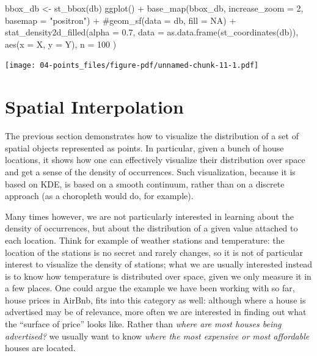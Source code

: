\documentclass[
  letterpaper,
  DIV=11,
  numbers=noendperiod,
  oneside]{scrreprt}
\newenvironment{Shaded}{\begin{snugshade}}{\end{snugshade}}
\newcommand{\AttributeTok}[1]{\textcolor[rgb]{0.40,0.45,0.13}{#1}}
\newcommand{\CommentTok}[1]{\textcolor[rgb]{0.37,0.37,0.37}{#1}}
\newcommand{\DecValTok}[1]{\textcolor[rgb]{0.68,0.00,0.00}{#1}}
\newcommand{\FloatTok}[1]{\textcolor[rgb]{0.68,0.00,0.00}{#1}}
\newcommand{\FunctionTok}[1]{\textcolor[rgb]{0.28,0.35,0.67}{#1}}
\newcommand{\NormalTok}[1]{\textcolor[rgb]{0.00,0.23,0.31}{#1}}
\newcommand{\OtherTok}[1]{\textcolor[rgb]{0.00,0.23,0.31}{#1}}
\newcommand{\SpecialCharTok}[1]{\textcolor[rgb]{0.37,0.37,0.37}{#1}}
\newcommand{\StringTok}[1]{\textcolor[rgb]{0.13,0.47,0.30}{#1}}
\begin{document}
\begin{Shaded}
\begin{Highlighting}[]
\NormalTok{bbox\_db }\OtherTok{\textless{}{-}} \FunctionTok{st\_bbox}\NormalTok{(db)}
\FunctionTok{ggplot}\NormalTok{() }\SpecialCharTok{+}
  \FunctionTok{base\_map}\NormalTok{(bbox\_db, }\AttributeTok{increase\_zoom =} \DecValTok{2}\NormalTok{, }\AttributeTok{basemap =} \StringTok{"positron"}\NormalTok{) }\SpecialCharTok{+}
  \CommentTok{\#geom\_sf(data = db, fill = NA) +}
  \FunctionTok{stat\_density2d\_filled}\NormalTok{(}\AttributeTok{alpha =} \FloatTok{0.7}\NormalTok{,}
    \AttributeTok{data =} \FunctionTok{as.data.frame}\NormalTok{(}\FunctionTok{st\_coordinates}\NormalTok{(db)), }
    \FunctionTok{aes}\NormalTok{(}\AttributeTok{x =}\NormalTok{ X, }\AttributeTok{y =}\NormalTok{ Y),}
    \AttributeTok{n =} \DecValTok{100}
\NormalTok{  )}
\end{Highlighting}
\end{Shaded}

\texttt{[image: 04-points\_files/figure-pdf/unnamed-chunk-11-1.pdf]}

\section{Spatial Interpolation}\label{spatial-interpolation}

The previous section demonstrates how to visualize the distribution of a
set of spatial objects represented as points. In particular, given a
bunch of house locations, it shows how one can effectively visualize
their distribution over space and get a sense of the density of
occurrences. Such visualization, because it is based on KDE, is based on
a smooth continuum, rather than on a discrete approach (as a choropleth
would do, for example).

Many times however, we are not particularly interested in learning about
the density of occurrences, but about the distribution of a given value
attached to each location. Think for example of weather stations and
temperature: the location of the stations is no secret and rarely
changes, so it is not of particular interest to visualize the density of
stations; what we are usually interested instead is to know how
temperature is distributed over space, given we only measure it in a few
places. One could argue the example we have been working with so far,
house prices in AirBnb, fits into this category as well: although where
a house is advertised may be of relevance, more often we are interested
in finding out what the ``surface of price'' looks like. Rather than
\emph{where are most houses being advertised?} we usually want to know
\emph{where the most expensive or most affordable} houses are located.
\end{document}
